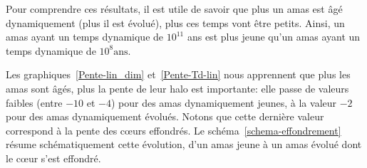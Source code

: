






		Pour comprendre ces résultats, il est utile de savoir que plus un amas est âgé
		dynamiquement (plus il est évolué), plus ces temps vont être petits. Ainsi, un amas
		ayant un temps dynamique de $10^{11}$ ans est plus jeune qu'un amas ayant un temps
		dynamique de $10^{8}\mathrm{ans}$.

		
		Les graphiques~\ref{Pente-lin_dim} et~\ref{Pente-Td-lin} nous apprennent que
		plus les amas sont âgés, plus la pente de leur halo est importante: elle passe de
		valeurs faibles (entre $-10$ et $-4$) pour des amas dynamiquement jeunes, à la valeur
		$-2$ pour des amas dynamiquement évolués. Notons que cette dernière valeur correspond à la pente des cœurs
		effondrés.
		Le schéma~\ref{schema-effondrement} résume schématiquement cette évolution,
		d'un amas jeune à un amas évolué dont le cœur s'est effondré.

